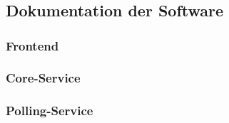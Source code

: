 \setpagestylefoot
\renewcommand{\thefigure}{A\arabic{figure}}
\renewcommand\thelstlisting{A\arabic{lstlisting}}
\renewcommand\thetable{A\arabic{table}}

\appendix
\renewcommand{\thechapter}{\Alph{chapter}}
\renewcommand{\thesection}{\Alph{chapter}.\Alph{section}}
\renewcommand{\thesubsection}{\Alph{chapter}.\Alph{section}.\Alph{subsection}}



\ifliteratur
    \printbibliography[heading=bibintoc,title={Quellen}]
\fi


\chapter{\langanhang}

\section{Dokumentation der Software}
\subsection{Frontend}
\subsection{Core-Service}
\subsection{Polling-Service}